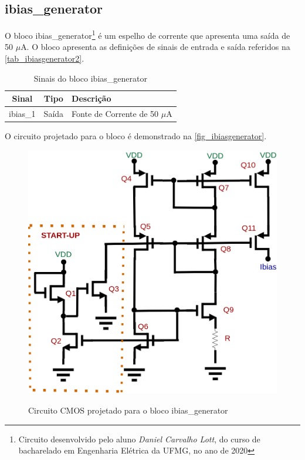 \renewcommand{\NomeBloco}{ibias\_generator}
\renewcommand{\NomeBlocoNoUnderline}{ibiasgenerator}
\renewcommand{\NomePTab}{tab_\NomeBlocoNoUnderline}
\renewcommand{\NomeSTab}{tab_\NomeBlocoNoUnderline2}
\renewcommand{\NomePFig}{fig_\NomeBlocoNoUnderline}
\renewcommand{\NomeSFig}{fig_\NomeBlocoNoUnderline2}
\renewcommand{\NomeTTab}{tab_\NomeBlocoNoUnderline3}
\renewcommand{\NomeQTab}{tab_\NomeBlocoNoUnderline4}

\subsection{ibias\_generator}
 
O bloco \NomeBloco{}\footnote{Circuito desenvolvido pelo aluno \textit{Daniel Carvalho Lott}, do curso de bacharelado em Engenharia Elétrica da UFMG, no ano de 2020} \'e um espelho de corrente que apresenta uma sa\'ida de 50 $\mu$A. O bloco apresenta as definições de sinais de entrada e sa\'ida referidos na \autoref{\NomeSTab}.

\begin{table}[!h]
\caption{Sinais do bloco \NomeBloco}
\label{\NomeSTab}
\centering
\begin{tabular}{ccl}

    \toprule
    Sinal & Tipo    & Descrição        \\
    \midrule \midrule
    ibias\_1   & Saída   & Fonte de Corrente de 50 $\mu$A \\
    \bottomrule
\end{tabular}
\end{table}

O circuito projetado para o bloco \'e demonstrado na \autoref{\NomePFig}.

\begin{figure}[htb]
 \centering
    \centering
    \caption{Circuito CMOS projetado para o bloco \NomeBloco} 
    \includegraphics[scale=0.3]{Circuitos/Ibias_generator.png}
    \label{\NomePFig}
\end{figure}

